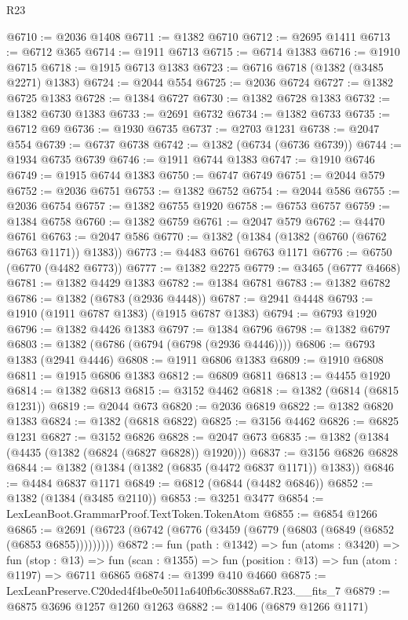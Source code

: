 \begin{lexlean}{R23}
\begin{coremodule}
@6710 := @2036 @1408
@6711 := @1382 @6710
@6712 := @2695 @1411
@6713 := @6712 @365
@6714 := @1911 @6713
@6715 := @6714 @1383
@6716 := @1910 @6715
@6718 := @1915 @6713 @1383
@6723 := @6716 @6718 (@1382 (@3485 @2271) @1383)
@6724 := @2044 @554
@6725 := @2036 @6724
@6727 := @1382 @6725 @1383
@6728 := @1384 @6727
@6730 := @1382 @6728 @1383
@6732 := @1382 @6730 @1383
@6733 := @2691 @6732
@6734 := @1382 @6733
@6735 := @6712 @69
@6736 := @1930 @6735
@6737 := @2703 @1231
@6738 := @2047 @554
@6739 := @6737 @6738
@6742 := @1382 (@6734 (@6736 @6739))
@6744 := @1934 @6735 @6739
@6746 := @1911 @6744 @1383
@6747 := @1910 @6746
@6749 := @1915 @6744 @1383
@6750 := @6747 @6749
@6751 := @2044 @579
@6752 := @2036 @6751
@6753 := @1382 @6752
@6754 := @2044 @586
@6755 := @2036 @6754
@6757 := @1382 @6755 @1920
@6758 := @6753 @6757
@6759 := @1384 @6758
@6760 := @1382 @6759
@6761 := @2047 @579
@6762 := @4470 @6761
@6763 := @2047 @586
@6770 := @1382 (@1384 (@1382 (@6760 (@6762 @6763 @1171)) @1383))
@6773 := @4483 @6761 @6763 @1171
@6776 := @6750 (@6770 (@4482 @6773))
@6777 := @1382 @2275
@6779 := @3465 (@6777 @4668)
@6781 := @1382 @4429 @1383
@6782 := @1384 @6781
@6783 := @1382 @6782
@6786 := @1382 (@6783 (@2936 @4448))
@6787 := @2941 @4448
@6793 := @1910 (@1911 @6787 @1383) (@1915 @6787 @1383)
@6794 := @6793 @1920
@6796 := @1382 @4426 @1383
@6797 := @1384 @6796
@6798 := @1382 @6797
@6803 := @1382 (@6786 (@6794 (@6798 (@2936 @4446))))
@6806 := @6793 @1383 (@2941 @4446)
@6808 := @1911 @6806 @1383
@6809 := @1910 @6808
@6811 := @1915 @6806 @1383
@6812 := @6809 @6811
@6813 := @4455 @1920
@6814 := @1382 @6813
@6815 := @3152 @4462
@6818 := @1382 (@6814 (@6815 @1231))
@6819 := @2044 @673
@6820 := @2036 @6819
@6822 := @1382 @6820 @1383
@6824 := @1382 (@6818 @6822)
@6825 := @3156 @4462
@6826 := @6825 @1231
@6827 := @3152 @6826
@6828 := @2047 @673
@6835 := @1382 (@1384 (@4435 (@1382 (@6824 (@6827 @6828)) @1920)))
@6837 := @3156 @6826 @6828
@6844 := @1382 (@1384 (@1382 (@6835 (@4472 @6837 @1171)) @1383))
@6846 := @4484 @6837 @1171
@6849 := @6812 (@6844 (@4482 @6846))
@6852 := @1382 (@1384 (@3485 @2110))
@6853 := @3251 @3477
@6854 := LexLeanBoot.GrammarProof.TextToken.TokenAtom
@6855 := @6854 @1266
@6865 := @2691 (@6723 (@6742 (@6776 (@3459 (@6779 (@6803 (@6849 (@6852 (@6853 @6855)))))))))
@6872 := fun (path : @1342) =>
  fun (atoms : @3420) =>
  fun (stop : @13) =>
  fun (scan : @1355) => fun (position : @13) => fun (atom : @1197) => @6711 @6865
@6874 := @1399 @410 @4660
@6875 := LexLeanPreserve.C20ded4f4be0e5011a640fb6c30888a67.R23.__fits_7
@6879 := @6875 @3696 @1257 @1260 @1263
@6882 := @1406 (@6879 @1266 @1171)

\end{coremodule}
\end{lexlean}
